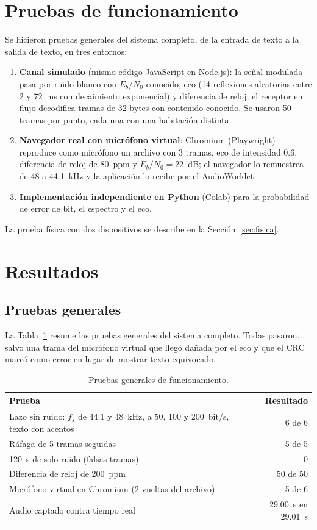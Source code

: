 \documentclass[10pt,twocolumn,letterpaper]{article}
\begin{document}
\section{Pruebas de funcionamiento}
Se hicieron pruebas generales del sistema completo, de la entrada de texto a la salida de texto, en tres entornos:
\begin{enumerate}
\item \textbf{Canal simulado} (mismo código JavaScript en Node.js): la señal modulada pasa por ruido blanco con $E_b/N_0$ conocido, eco (14 reflexiones aleatorias entre 2 y 72~ms con decaimiento exponencial) y diferencia de reloj; el receptor en flujo decodifica tramas de 32 bytes con contenido conocido. Se usaron 50 tramas por punto, cada una con una habitación distinta.
\item \textbf{Navegador real con micrófono virtual}: Chromium (Playwright) reproduce como micrófono un archivo con 3 tramas, eco de intensidad 0.6, diferencia de reloj de 80~ppm y $E_b/N_0 = 22$~dB; el navegador lo remuestrea de 48 a 44.1~kHz y la aplicación lo recibe por el AudioWorklet.
\item \textbf{Implementación independiente en Python} (Colab) para la probabilidad de error de bit, el espectro y el eco.
\end{enumerate}
La prueba física con dos dispositivos se describe en la Sección~\ref{sec:fisica}.

\section{Resultados}
\subsection{Pruebas generales}
La Tabla~\ref{tab:func} resume las pruebas generales del sistema completo. Todas pasaron, salvo una trama del micrófono virtual que llegó dañada por el eco y que el CRC marcó como error en lugar de mostrar texto equivocado.

\begin{table}[h]
\centering\small
\caption{Pruebas generales de funcionamiento.}\label{tab:func}
\begin{tabularx}{\columnwidth}{@{}Xr@{}}
\toprule
\textbf{Prueba} & \textbf{Resultado} \\
\midrule
Lazo sin ruido: $f_s$ de 44.1 y 48~kHz, a 50, 100 y 200~bit/s, texto con acentos & 6 de 6 \\
Ráfaga de 5 tramas seguidas & 5 de 5 \\
120~s de solo ruido (falsas tramas) & 0 \\
Diferencia de reloj de 200~ppm & 50 de 50 \\
Micrófono virtual en Chromium (2 vueltas del archivo) & 5 de 6 \\
Audio captado contra tiempo real & 29.00~s en 29.01~s \\
\bottomrule
\end{tabularx}
\end{table}
\end{document}
